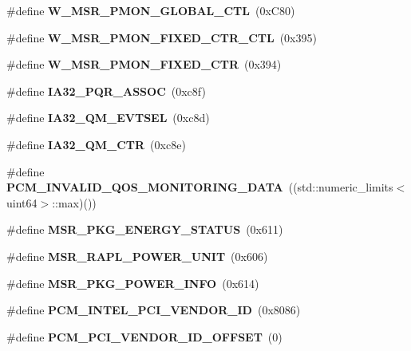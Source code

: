 \begin{DoxyCompactItemize}
\item 
\#define {\bfseries W\+\_\+\+M\+S\+R\+\_\+\+P\+M\+O\+N\+\_\+\+G\+L\+O\+B\+A\+L\+\_\+\+C\+TL}~(0x\+C80)\label{types_8h_a376e23efde84a32d52b77f0849294aa0}

\item 
\#define {\bfseries W\+\_\+\+M\+S\+R\+\_\+\+P\+M\+O\+N\+\_\+\+F\+I\+X\+E\+D\+\_\+\+C\+T\+R\+\_\+\+C\+TL}~(0x395)\label{types_8h_a42bbda41bb44de4240699ce676c55258}

\item 
\#define {\bfseries W\+\_\+\+M\+S\+R\+\_\+\+P\+M\+O\+N\+\_\+\+F\+I\+X\+E\+D\+\_\+\+C\+TR}~(0x394)\label{types_8h_a38fcd86b97b8afd997982fbc3313e5e4}

\item 
\#define {\bfseries I\+A32\+\_\+\+P\+Q\+R\+\_\+\+A\+S\+S\+OC}~(0xc8f)\label{types_8h_a8de132d539b79a85d803bfccdc9383ad}

\item 
\#define {\bfseries I\+A32\+\_\+\+Q\+M\+\_\+\+E\+V\+T\+S\+EL}~(0xc8d)\label{types_8h_a15b6fe9866f264321ea09304a08c2f77}

\item 
\#define {\bfseries I\+A32\+\_\+\+Q\+M\+\_\+\+C\+TR}~(0xc8e)\label{types_8h_a92fa198c0abe9741b9b25ed5cb6eff57}

\item 
\#define {\bfseries P\+C\+M\+\_\+\+I\+N\+V\+A\+L\+I\+D\+\_\+\+Q\+O\+S\+\_\+\+M\+O\+N\+I\+T\+O\+R\+I\+N\+G\+\_\+\+D\+A\+TA}~((std\+::numeric\+\_\+limits$<$uint64$>$\+::max)())\label{types_8h_a337178dd27507783e200cd10bcea2ca3}

\item 
\#define {\bfseries M\+S\+R\+\_\+\+P\+K\+G\+\_\+\+E\+N\+E\+R\+G\+Y\+\_\+\+S\+T\+A\+T\+US}~(0x611)\label{types_8h_ae8952c7da879bc4523085c453d0bf460}

\item 
\#define {\bfseries M\+S\+R\+\_\+\+R\+A\+P\+L\+\_\+\+P\+O\+W\+E\+R\+\_\+\+U\+N\+IT}~(0x606)\label{types_8h_a888543788798e9b5a48ecac73b5169c2}

\item 
\#define {\bfseries M\+S\+R\+\_\+\+P\+K\+G\+\_\+\+P\+O\+W\+E\+R\+\_\+\+I\+N\+FO}~(0x614)\label{types_8h_a442cae088121674772e8c0dc5ab4d8bf}

\item 
\#define {\bfseries P\+C\+M\+\_\+\+I\+N\+T\+E\+L\+\_\+\+P\+C\+I\+\_\+\+V\+E\+N\+D\+O\+R\+\_\+\+ID}~(0x8086)\label{types_8h_ac1d4e070698e66acba029e80c1d4d36e}

\item 
\#define {\bfseries P\+C\+M\+\_\+\+P\+C\+I\+\_\+\+V\+E\+N\+D\+O\+R\+\_\+\+I\+D\+\_\+\+O\+F\+F\+S\+ET}~(0)\label{types_8h_a555a8cb40b170bdcf49d2d6b1cd1d368}


\end{DoxyCompactItemize}
